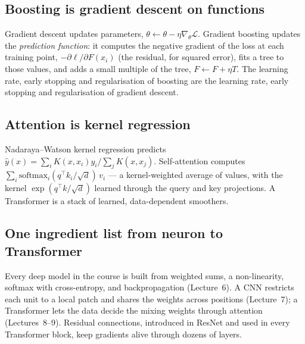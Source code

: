 \documentclass[11pt]{article}
\begin{document}
\subsection{Boosting is gradient descent on functions}
Gradient descent updates parameters, $\theta\leftarrow\theta-\eta\nabla_\theta\mathcal L$. Gradient boosting updates the \emph{prediction function}: it computes the negative gradient of the loss at each training point, $-\partial\ell/\partial F(x_i)$ (the residual, for squared error), fits a tree to those values, and adds a small multiple of the tree, $F\leftarrow F+\eta T$. The learning rate, early stopping and regularisation of boosting are the learning rate, early stopping and regularisation of gradient descent.

\subsection{Attention is kernel regression}
Nadaraya--Watson kernel regression predicts $\hat y(x)=\sum_iK(x,x_i)y_i/\sum_jK(x,x_j)$. Self-attention computes $\sum_i\text{softmax}_i(q^\top k_i/\sqrt d)\,v_i$ --- a kernel-weighted average of values, with the kernel $\exp(q^\top k/\sqrt d)$ learned through the query and key projections. A Transformer is a stack of learned, data-dependent smoothers.

\subsection{One ingredient list from neuron to Transformer}
Every deep model in the course is built from weighted sums, a non-linearity, softmax with cross-entropy, and backpropagation (Lecture~6). A CNN restricts each unit to a local patch and shares the weights across positions (Lecture~7); a Transformer lets the data decide the mixing weights through attention (Lectures~8--9). Residual connections, introduced in ResNet and used in every Transformer block, keep gradients alive through dozens of layers.
\end{document}
